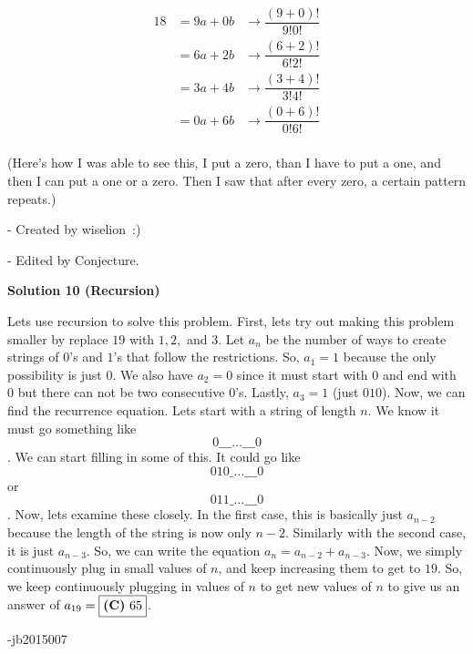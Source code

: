 \begin{enumerate}
 \begin{align*}18 &= 9a + 0b &\rightarrow \dfrac{(9+0)!}{9!0!} \\&= 6a + 2b &\rightarrow \dfrac{(6+2)!}{6!2!}\\&= 3a + 4b &\rightarrow \dfrac{(3 + 4)!}{3!4!}\\&= 0a + 6b &\rightarrow \dfrac{(0+6)!}{0!6!}\\\end{align*}


 
(Here's how I was able to see this, I put a zero, than I have to put a one, and then I can put a one or a zero. Then I saw that after every zero, a certain pattern repeats.)

 - Created by wiselion :)

 - Edited by Conjecture.

 



\textbf{Solution 10 (Recursion)}

Lets use recursion to solve this problem. First, lets try out making this problem smaller by replace $19$ with $1,2,$ and $3$. Let $a_n$ be the number of ways to create strings of $0$'s and $1$'s that follow the restrictions. So, $a_1=1$ because the only possibility is just $0$. We also have $a_2=0$ since it must start with $0$ and end with $0$ but there can not be two consecutive $0$'s. Lastly, $a_3=1$ (just $010$). Now, we can find the recurrence equation. Lets start with a string of length $n$. We know it must go something like 
 \[0 \_\_\_\ldots\_\_\_ 0\]. We can start filling in some of this. It could go like 
 \[0 1 0 \_\ldots\_\_\_ 0\] or 
 \[0 1 1 \_\ldots\_\_\_ 0\]. Now, lets examine these closely. In the first case, this is basically just $a_{n-2}$ because the length of the string is now only $n-2$. Similarly with the second case, it is just $a_{n-3}$. So, we can write the equation $a_n=a_{n-2}+a_{n-3}$. Now, we simply continuously plug in small values of $n$, and keep increasing them to get to $19$. So, we keep continuously plugging in values of $n$ to get new values of $n$ to give us an answer of $a_{19}=\boxed{\text{\textbf{(C)}  } 65}$.

 -jb2015007

 


\end{enumerate}